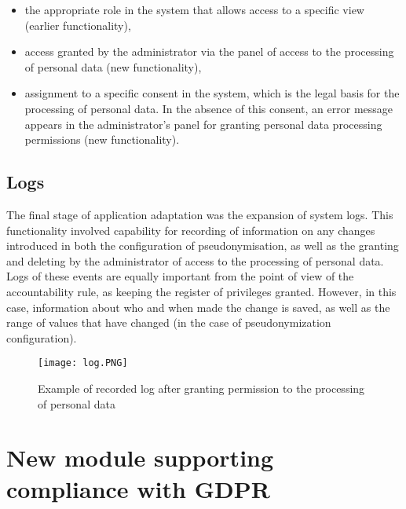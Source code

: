 \documentclass[en, noamssymb]{mgr}
\begin{document}
\begin{itemize}

\item the appropriate role in the system that allows access to a specific view (earlier functionality),
\item access granted by the administrator via the panel of access to the processing of personal data (new functionality),
\item assignment to a specific consent in the system, which is the legal basis for the processing of personal data. In the absence of this consent, an error message appears in the administrator's panel for granting personal data processing permissions (new functionality).

\end{itemize}


\subsection{Logs}

The final stage of application adaptation was the expansion of system logs. This functionality involved capability for recording of information on any changes introduced in both the configuration of pseudonymisation, as well as the granting and deleting by the administrator of access to the processing of personal data. Logs of these events are equally important from the point of view of the accountability rule, as keeping the register of privileges granted. However, in this case, information about who and when made the change is saved, as well as the range of values that have changed (in the case of pseudonymization configuration). 

\begin{figure}[H]
	\centering
	\texttt{[image: log.PNG]}
	\caption[Example of recorded log after granting permission to the processing of personal data]{Example of recorded log after granting permission to the processing of personal data}
	\label{fig:Logs}
\end{figure}

\section{New module supporting compliance with GDPR}
 
\end{document}
